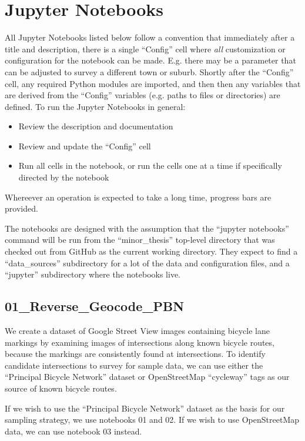 \documentclass[11pt,twoside]{report}
\begin{document}
\section{Jupyter Notebooks}
\label{aj}

All Jupyter Notebooks listed below follow a convention that immediately after a title and description, there is a single ``Config'' cell where \textit{all} customization or configuration for the notebook can be made.  E.g. there may be a parameter that can be adjusted to survey a different town or suburb.  Shortly after the ``Config'' cell, any required Python modules are imported, and then then any variables that are derived from the ``Config'' variables (e.g. paths to files or directories) are defined.  To run the Jupyter Notebooks in general:

\begin{itemize}
\item{Review the description and documentation}
\item{Review and update the ``Config'' cell}
\item{Run all cells in the notebook, or run the cells one at a time if specifically directed by the notebook}	
\end{itemize}
Whereever an operation is expected to take a long time, progress bars are provided.

The notebooks are designed with the assumption that the ``jupyter notebooks'' command will be run from the ``minor\_thesis'' top-level directory that was checked out from GitHub as the current working directory.  They expect to find a ``data\_sources'' subdirectory for a lot of the data and configuration files, and a ``jupyter'' subdirectory where the notebooks live.

\subsection{01\_Reverse\_Geocode\_PBN}
\label{aj01}

We create a dataset of Google Street View images containing bicycle lane markings by examining images of intersections along known bicycle routes, because the markings are consistently found at intersections.  To identify candidate intersections to survey for sample data, we can use either the ``Principal Bicycle Network'' dataset or OpenStreetMap ``cycleway'' tags as our source of known bicycle routes.

If we wish to use the ``Principal Bicycle Network'' dataset as the basis for our sampling strategy, we use notebooks 01 and 02.  If we wish to use OpenStreetMap data, we can use notebook 03 instead.
\end{document}
